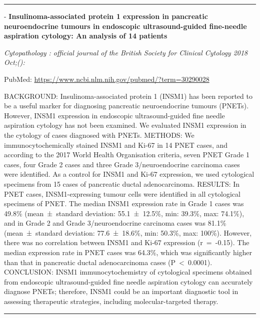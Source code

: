 \documentclass[]{article}
\begin{document}
{}

\begin{center}\rule{0.5\linewidth}{\linethickness}\end{center}

 - \textbf{Insulinoma-associated protein 1 expression in pancreatic
neuroendocrine tumours in endoscopic ultrasound-guided fine-needle
aspiration cytology: An analysis of 14 patients}

\emph{Cytopathology : official journal of the British Society for
Clinical Cytology 2018 Oct;():}

PubMed: \url{https://www.ncbi.nlm.nih.gov/pubmed/?term=30290028}

BACKGROUND: Insulinoma-associated protein 1 (INSM1) has been reported to
be a useful marker for diagnosing pancreatic neuroendocrine tumours
(PNETs). However, INSM1 expression in endoscopic ultrasound-guided fine
needle aspiration cytology has not been examined. We evaluated INSM1
expression in the cytology of cases diagnosed with PNETs. METHODS: We
immunocytochemically stained INSM1 and Ki-67 in 14 PNET cases, and
according to the 2017 World Health Organisation criteria, seven PNET
Grade 1 cases, four Grade 2 cases and three Grade 3/neuroendocrine
carcinoma cases were identified. As a control for INSM1 and Ki-67
expression, we used cytological specimens from 15 cases of pancreatic
ductal adenocarcinoma. RESULTS: In PNET cases, INSM1-expressing tumour
cells were identified in all cytological specimens of PNET. The median
INSM1 expression rate in Grade 1 cases was 49.8\% (mean~±~standard
deviation: 55.1~±~12.5\%, min: 39.3\%, max: 74.1\%), and in Grade 2 and
Grade 3/neuroendocrine carcinoma cases was 81.1\% (mean~±~standard
deviation: 77.6~±~18.6\%, min: 50.3\%, max: 100\%). However, there was
no correlation between INSM1 and Ki-67 expression (r~=~-0.15). The
median expression rate in PNET cases was 64.3\%, which was significantly
higher than that in pancreatic ductal adenocarcinoma cases
(P~\textless{}~0.0001). CONCLUSION: INSM1 immunocytochemistry of
cytological specimens obtained from endoscopic ultrasound-guided fine
needle aspiration cytology can accurately diagnose PNETs; therefore,
INSM1 could be an important diagnostic tool in assessing therapeutic
strategies, including molecular-targeted therapy.

{}

{}

\begin{center}\rule{0.5\linewidth}{\linethickness}\end{center}
\end{document}
